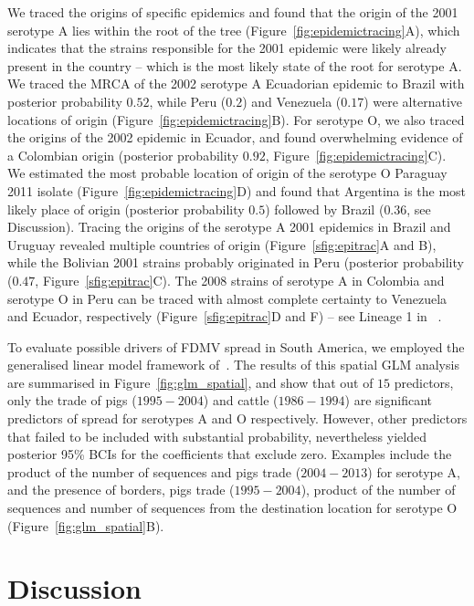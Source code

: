 \documentclass[10pt]{article}
\begin{document}
We traced the origins of specific epidemics and found that the origin of the 2001 serotype A lies within the root of the tree (Figure~\ref{fig:epidemictracing}A), which indicates that the strains responsible for the 2001 epidemic were likely already present in the country -- which is the most likely state of the root for serotype A.
We traced the MRCA of the 2002 serotype A Ecuadorian epidemic to Brazil with posterior probability $0.52$, while Peru ($0.2$) and Venezuela ($0.17$) were alternative locations of origin (Figure~\ref{fig:epidemictracing}B).
For serotype O, we also traced the origins of the 2002 epidemic in Ecuador, and found overwhelming evidence of a Colombian origin (posterior probability $0.92$, Figure~\ref{fig:epidemictracing}C).
We estimated the most probable location of origin of the serotype O Paraguay 2011 isolate (Figure~\ref{fig:epidemictracing}D) and found that Argentina is the most likely place of origin (posterior probability $0.5$) followed by Brazil ($0.36$, see Discussion).
Tracing the origins of the serotype A 2001 epidemics in Brazil and Uruguay revealed multiple countries of origin (Figure~\ref{sfig:epitrac}A and B), while the Bolivian 2001 strains probably originated in Peru (posterior probability ($0.47$, Figure~\ref{sfig:epitrac}C).
The 2008 strains of serotype A in Colombia and serotype O in Peru can be traced with almost complete certainty to Venezuela and Ecuador, respectively (Figure~\ref{sfig:epitrac}D and F) -- see Lineage 1 in ~\cite{Malirat2012}.

To evaluate possible drivers of FDMV spread in South America, we employed the generalised linear model framework of~\cite{Lemey2014}.
The results of this spatial GLM analysis are summarised in Figure~\ref{fig:glm_spatial}, and show that out of $15$ predictors, only the trade of pigs ($1995-2004$) and cattle ($1986-1994$) are significant predictors of spread for serotypes A and O respectively.
However, other predictors that failed to be included with substantial probability, nevertheless yielded posterior 95\% BCIs for the coefficients that exclude zero.
Examples include the product of the number of sequences and pigs trade ($2004-2013$) for serotype A, and the presence of borders, pigs trade ($1995-2004$), product of the number of sequences and number of sequences from the destination location for serotype O (Figure~\ref{fig:glm_spatial}B).

\section*{Discussion}
\end{document}
